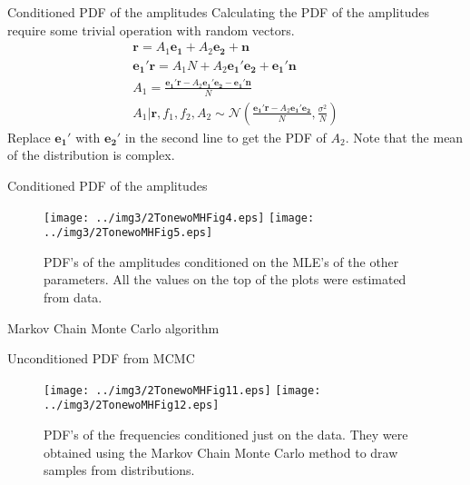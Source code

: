 ﻿\documentclass[mathserif]{beamer}
\begin{document}
	\begin{frame}{Conditioned PDF of the amplitudes}
		Calculating the PDF of the amplitudes require some trivial operation with random vectors.
		\begin{gather*}
			\mathbf{r} =  A_1\mathbf{e_1}+A_2\mathbf{e_2}+\mathbf{n}\\
			\mathbf{e_1'r} = A_1N+A_2\mathbf{e_1'e_2}+\mathbf{e_1'n}\\
			A_1 = \frac{\mathbf{e_1'r}-A_2\mathbf{e_1'e_2}-\mathbf{e_1'n}}{N}\\
			A_1|\mathbf{r},f_1,f_2,A_2 \sim \mathcal{N}\left(\frac{\mathbf{e_1'r}-A_2\mathbf{e_1'e_2}}{N},\frac{\sigma^2}{N}\right)
		\end{gather*}
		Replace $\mathbf{e_1'}$ with $\mathbf{e_2'}$ in the second line to get the PDF of $A_2$. Note that the mean of the distribution is complex.
		
	\end{frame}
	
	\begin{frame}{Conditioned PDF of the amplitudes}
		\begin{figure}
			\centering
			\texttt{[image: ../img3/2TonewoMHFig4.eps]}
			\texttt{[image: ../img3/2TonewoMHFig5.eps]}
			\caption{PDF's of the amplitudes conditioned on the MLE's of the other parameters. All the values on the top of the plots were estimated from data.}
		\end{figure}
	\end{frame}
	
	\begin{frame}{Markov Chain Monte Carlo algorithm}
		\begin{algorithm}[H]
		\end{algorithm}
	\end{frame}
	
	\begin{frame}{Unconditioned PDF from MCMC}
		\begin{figure}
			\centering
			\texttt{[image: ../img3/2TonewoMHFig11.eps]}
			\texttt{[image: ../img3/2TonewoMHFig12.eps]}
			\caption{PDF's of the frequencies conditioned just on the data. They were obtained using the Markov Chain Monte Carlo method to draw samples from distributions.}
		\end{figure}
	\end{frame}
	
\end{document}
